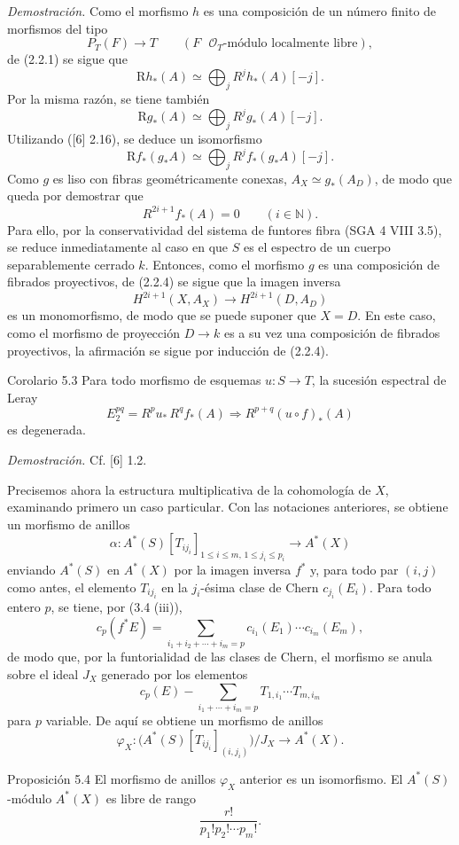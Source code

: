 \emph{Demostración.} Como el morfismo $h$ es una composición de un número finito de morfismos del tipo
\[
P_T(F)\to T\qquad (F\text{ }\mathcal O_T\text{-módulo localmente libre}),
\tag{Q}
\]
de (2.2.1) se sigue que
\[
\mathrm Rh_*(A)\simeq\bigoplus_j R^jh_*(A)[-j].
\]
Por la misma razón, se tiene también
\[
\mathrm Rg_*(A)\simeq\bigoplus_j R^jg_*(A)[-j].
\]
Utilizando ([6] 2.16), se deduce un isomorfismo
\[
\mathrm Rf_*(g_*A)\simeq\bigoplus_j R^j f_*(g_*A)[-j].
\]
Como $g$ es liso con fibras geométricamente conexas, $A_X\simeq g_*(A_D)$, de modo que queda por demostrar que
\[
R^{2i+1}f_*(A)=0\qquad (i\in\mathbb N).
\tag{5.2.1}
\]
Para ello, por la conservatividad del sistema de funtores fibra (SGA 4 VIII 3.5), se reduce inmediatamente al caso en que $S$ es el espectro de un cuerpo separablemente cerrado $k$. Entonces, como el morfismo $g$ es una composición de fibrados proyectivos, de (2.2.4) se sigue que la imagen inversa
\[
H^{2i+1}(X,A_X)\to H^{2i+1}(D,A_D)
\]
es un monomorfismo, de modo que se puede suponer que $X=D$. En este caso, como el morfismo de proyección $D\to k$ es a su vez una composición de fibrados proyectivos, la afirmación se sigue por inducción de (2.2.4).

\begin{statement}{Corolario 5.3}
Para todo morfismo de esquemas $u:S\to T$, la sucesión espectral de Leray
\[
E_2^{pq}=R^p u_*\,R^q f_*(A)\Rightarrow R^{p+q}(u\circ f)_*(A)
\]
es degenerada.
\end{statement}

\emph{Demostración.} Cf. [6] 1.2.

Precisemos ahora la estructura multiplicativa de la cohomología de $X$, examinando primero un caso particular. Con las notaciones anteriores, se obtiene un morfismo de anillos
\[
\alpha:A^*(S)[T_{ij_i}]_{1\le i\le m,\,1\le j_i\le p_i}\to A^*(X)
\]
enviando $A^*(S)$ en $A^*(X)$ por la imagen inversa $f^*$ y, para todo par $(i,j)$ como antes, el elemento $T_{ij_i}$ en la $j_i$-ésima clase de Chern $c_{j_i}(E_i)$. Para todo entero $p$, se tiene, por (3.4 (iii)),
\[
c_p(f^*E)=\sum_{i_1+i_2+\cdots+i_m=p}c_{i_1}(E_1)\cdots c_{i_m}(E_m),
\]
de modo que, por la funtorialidad de las clases de Chern, el morfismo se anula sobre el ideal $J_X$ generado por los elementos
\[
c_p(E)-\sum_{i_1+\cdots+i_m=p}T_{1,i_1}\cdots T_{m,i_m}
\]
para $p$ variable. De aquí se obtiene un morfismo de anillos
\[
\varphi_X:\bigl(A^*(S)[T_{ij_i}]_{(i,j_i)}\bigr)/J_X\to A^*(X).
\]

\begin{statement}{Proposición 5.4}
El morfismo de anillos $\varphi_X$ anterior es un isomorfismo. El $A^*(S)$-módulo $A^*(X)$ es libre de rango
\[
\frac{r!}{p_1!p_2!\cdots p_m!}.
\]
\end{statement}
